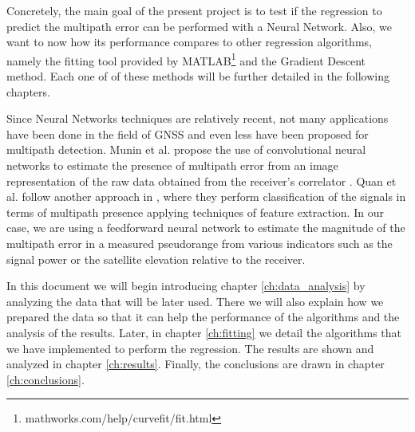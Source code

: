 \documentclass[a4paper, report, oneside, UKenglish]{memoir}
\begin{document}
Concretely, the main goal of the present project is to test if the regression to predict the multipath error can be performed with a Neural Network. Also, we want to now how its performance compares to other regression algorithms, namely the fitting tool provided by MATLAB\textsuperscript{\tiny\textregistered}\footnote{mathworks.com/help/curvefit/fit.html} and the Gradient Descent method. Each one of of these methods will be further detailed in the following chapters. 

Since Neural Networks techniques are relatively recent, not many applications have been done in the field of GNSS and even less have been proposed for multipath detection. Munin et al. propose the use of convolutional neural networks to estimate the presence of multipath error from an image representation of the raw data obtained from the receiver's correlator \cite{munin_convolutional_2019}. Quan et al. follow another approach in \cite{quan_convolutional_2018}, where they perform classification of the signals in terms of multipath presence applying techniques of feature extraction. In our case, we are using a feedforward neural network to estimate the magnitude of the multipath error in a measured pseudorange from various indicators such as the signal power or the satellite elevation relative to the receiver.

In this document we will begin introducing chapter \ref{ch:data_analysis} by analyzing the data that will be later used. There we will also explain how we prepared the data so that it can help the performance of the algorithms and the analysis of the results. Later, in chapter \ref{ch:fitting} we detail the algorithms that we have implemented to perform the regression. The results are shown and analyzed in chapter \ref{ch:results}. Finally, the conclusions are drawn in chapter \ref{ch:conclusions}.


\end{document}
